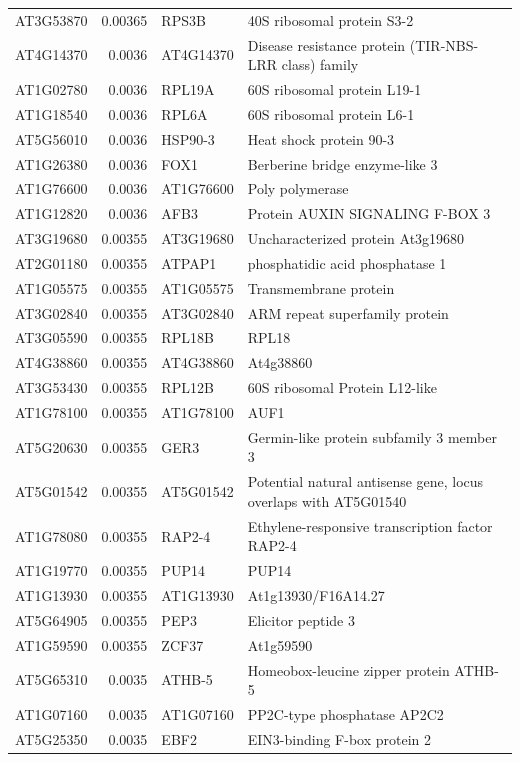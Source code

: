 \documentclass[11pt]{article}
\begin{document}
\begin{center}
\begin{tabular}{lrll}
AT3G53870 & 0.00365 & RPS3B & 40S ribosomal protein S3-2\\
AT4G14370 & 0.0036 & AT4G14370 & Disease resistance protein (TIR-NBS-LRR class) family\\
AT1G02780 & 0.0036 & RPL19A & 60S ribosomal protein L19-1\\
AT1G18540 & 0.0036 & RPL6A & 60S ribosomal protein L6-1\\
AT5G56010 & 0.0036 & HSP90-3 & Heat shock protein 90-3\\
AT1G26380 & 0.0036 & FOX1 & Berberine bridge enzyme-like 3\\
AT1G76600 & 0.0036 & AT1G76600 & Poly polymerase\\
AT1G12820 & 0.0036 & AFB3 & Protein AUXIN SIGNALING F-BOX 3\\
AT3G19680 & 0.00355 & AT3G19680 & Uncharacterized protein At3g19680\\
AT2G01180 & 0.00355 & ATPAP1 & phosphatidic acid phosphatase 1\\
AT1G05575 & 0.00355 & AT1G05575 & Transmembrane protein\\
AT3G02840 & 0.00355 & AT3G02840 & ARM repeat superfamily protein\\
AT3G05590 & 0.00355 & RPL18B & RPL18\\
AT4G38860 & 0.00355 & AT4G38860 & At4g38860\\
AT3G53430 & 0.00355 & RPL12B & 60S ribosomal Protein L12-like\\
AT1G78100 & 0.00355 & AT1G78100 & AUF1\\
AT5G20630 & 0.00355 & GER3 & Germin-like protein subfamily 3 member 3\\
AT5G01542 & 0.00355 & AT5G01542 & Potential natural antisense gene, locus overlaps with AT5G01540\\
AT1G78080 & 0.00355 & RAP2-4 & Ethylene-responsive transcription factor RAP2-4\\
AT1G19770 & 0.00355 & PUP14 & PUP14\\
AT1G13930 & 0.00355 & AT1G13930 & At1g13930/F16A14.27\\
AT5G64905 & 0.00355 & PEP3 & Elicitor peptide 3\\
AT1G59590 & 0.00355 & ZCF37 & At1g59590\\
AT5G65310 & 0.0035 & ATHB-5 & Homeobox-leucine zipper protein ATHB-5\\
AT1G07160 & 0.0035 & AT1G07160 & PP2C-type phosphatase AP2C2\\
AT5G25350 & 0.0035 & EBF2 & EIN3-binding F-box protein 2\\

\end{tabular}
\end{center}
\end{document}
